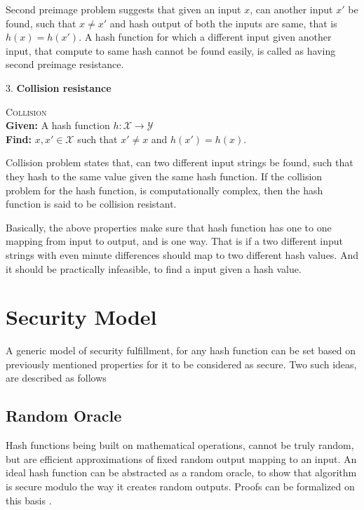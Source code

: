 Second preimage problem suggests that given an input $x$, can another input $x'$ be found, such that
$ x \neq x'$ and hash output of both the inputs are same, that is $h(x) = h(x')$. A hash function for
which a different input given another input, that compute to same hash cannot be found easily, is 
called as having second preimage resistance.

3. {\bf Collision resistance}
\begin{center}
  \framebox
  {
    \parbox{300pt}
    {
      \centering \textsc{Collision} \\
      {\bf Given:} A hash function $h : \mathcal{X} \to \mathcal{Y}$ \\
      {\bf Find:} $x, x' \in \mathcal{X}$ such that $x' \neq x$ and $h(x') = h(x)$. 
    }
  }
\end{center}
\vspace{4mm}

Collision problem states that, can two different input strings be found, such that they hash to the
same value given the same hash function. If the collision problem for the hash function, is computationally
complex, then the hash function is said to be collision resistant.

Basically, the above properties make sure that hash function has one to one mapping from input to
output, and is one way. That is if a two different input strings with even minute differences should
map to two different hash values. And it should be practically infeasible, to find a input given a
hash value.

\section{Security Model}

A generic model of security fulfillment, for any hash function can be set based on previously mentioned
properties for it to be considered as secure. Two such ideas, are described as follows 

  \subsection{ Random Oracle }
  Hash functions being built on mathematical operations, cannot be truly random, but are efficient
  approximations of fixed random output mapping to an input. An ideal hash function can be abstracted 
  as a random oracle, to show that algorithm is secure modulo the way it creates random outputs. Proofs
  can be formalized on this basis \cite{00018}.


